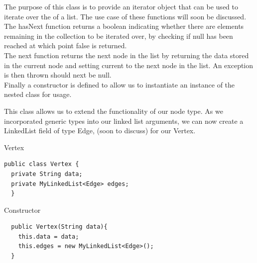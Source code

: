 \documentclass[a4paper]{article}
\begin{document}
The purpose of this class is to provide an iterator object that can be used to iterate over the of a list.
The use case of these functions will soon be discussed.\\

The hasNext function returns a boolean indicating whether there are elements remaining in the collection to be iterated over,
by checking if null has been reached at which point false is returned. \\

The next function returns the next node in the list by
returning the data stored in the current node and setting current to the next node in the list.
An exception is then thrown should next be null. \\

Finally a constructor is defined to allow us to instantiate an instance of the nested class for usage. \\

\newpage




\vspace{6mm}
\makeatletter
\renewcommand{\ALG@name}{Class}
\makeatother
\setcounter{algorithm}{1}

This class allows us to extend the functionality of our 
node type. As we incorporated generic types into our linked list arguments,
we can now create a LinkedList field of type Edge, (soon to discuss) for our Vertex.


\vspace{12mm}

\begin{algorithm}
\caption{Vertex}\label{euclid}
\begin{verbatim}
public class Vertex {
  private String data;
  private MyLinkedList<Edge> edges;
  }
\end{verbatim}
\end{algorithm}

\makeatletter
\renewcommand{\ALG@name}{Vertex Function}
\makeatother
\setcounter{algorithm}{0}


\vspace{6mm}


\begin{algorithm}
\caption{Constructor}\label{euclid}
\begin{verbatim}
  public Vertex(String data){
    this.data = data;
    this.edges = new MyLinkedList<Edge>();
  }
\end{verbatim}
\end{algorithm}
\end{document}

